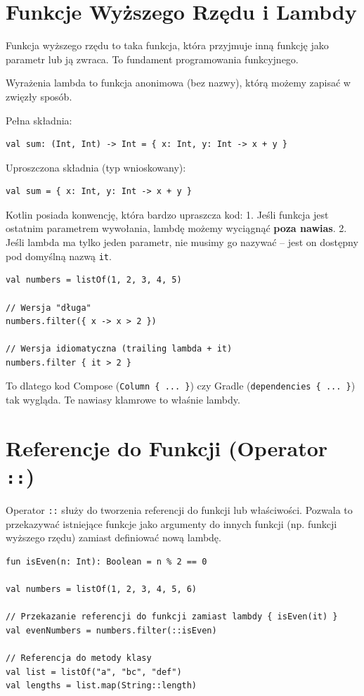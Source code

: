 \section{Funkcje Wyższego Rzędu i Lambdy}

Funkcja wyższego rzędu to taka funkcja, która przyjmuje inną funkcję jako parametr lub ją zwraca. To fundament programowania funkcyjnego.

Wyrażenia lambda to funkcja anonimowa (bez nazwy), którą możemy zapisać w zwięzły sposób.

Pełna składnia:
\begin{verbatim}
val sum: (Int, Int) -> Int = { x: Int, y: Int -> x + y }
\end{verbatim}

Uproszczona składnia (typ wnioskowany):
\begin{verbatim}
val sum = { x: Int, y: Int -> x + y }
\end{verbatim}

Kotlin posiada konwencję, która bardzo upraszcza kod:
1. Jeśli funkcja jest ostatnim parametrem wywołania, lambdę możemy wyciągnąć \textbf{poza nawias}.
2. Jeśli lambda ma tylko jeden parametr, nie musimy go nazywać – jest on dostępny pod domyślną nazwą \texttt{it}.

\begin{verbatim}
val numbers = listOf(1, 2, 3, 4, 5)

// Wersja "długa"
numbers.filter({ x -> x > 2 })

// Wersja idiomatyczna (trailing lambda + it)
numbers.filter { it > 2 }
\end{verbatim}

To dlatego kod Compose (\texttt{Column \{ ... \}}) czy Gradle (\texttt{dependencies \{ ... \}}) tak wygląda. Te nawiasy klamrowe to właśnie lambdy.

\section{Referencje do Funkcji (Operator \texttt{::})}

Operator \texttt{::} służy do tworzenia referencji do funkcji lub właściwości. Pozwala to przekazywać istniejące funkcje jako argumenty do innych funkcji (np. funkcji wyższego rzędu) zamiast definiować nową lambdę.

\begin{verbatim}
fun isEven(n: Int): Boolean = n % 2 == 0

val numbers = listOf(1, 2, 3, 4, 5, 6)

// Przekazanie referencji do funkcji zamiast lambdy { isEven(it) }
val evenNumbers = numbers.filter(::isEven)

// Referencja do metody klasy
val list = listOf("a", "bc", "def")
val lengths = list.map(String::length)
\end{verbatim}

